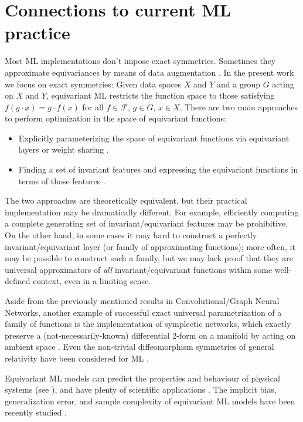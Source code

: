 \documentclass[preprint]{article} %
\renewcommand{\mathcal}[1]{\mathscr{#1}} %
\begin{document}
\section{Connections to current ML practice}\label{sec:practice}
Most ML implementations don't impose exact symmetries. Sometimes they approximate equivariances by means of data augmentation \citep{chen2020group, huang2022quantifying}.
In the present work we focus on exact symmetries: Given data spaces $X$ and $Y$ and a group $G$ acting on $X$ and $Y$, equivariant ML restricts the function space to those satisfying  $f(g\cdot x) = g \cdot f(x)$ for all $f\in \mathcal F$, $g\in G$, $x\in X$.
There are two main approaches to perform optimization in the space of equivariant functions:
\begin{itemize}
    \item Explicitly parameterizing the space of equivariant functions via equivariant layers or weight sharing \citep{cohen2016group, kondor2018convolution, thomas2018tensor, geiger2022e3nn, finzi2020generalizing, finzi2021practical}.
    \item Finding a set of invariant features and expressing the equivariant functions in terms of those features \citep{villar2021scalars,blum2022equivariant}.
\end{itemize}
The two approaches are theoretically equivalent, but their practical implementation may be dramatically different. For example, efficiently computing a complete generating set of invariant/equivariant features may be prohibitive. On the other hand, in some cases it may hard to construct a perfectly invariant/equivariant layer (or family of approximating functions); more often, it may be possible to construct such a family, but we may lack proof that they are universal approximators of \textit{all} invariant/equivariant functions within some well-defined context, even in a limiting sense.

Aside from the previously mentioned results in Convolutional/Graph Neural Networks, another example of successful exact universal parametrization of a family of functions is the implementation of symplectic networks, which exactly preserve a (not-necessarily-known) differential 2-form on a manifold by acting on ambient space \citep{sympnets,henonnets}. Even the non-trivial diffeomorphism symmetries of general relativity have been considered for ML \citep{weiler}.
 
Equivariant ML models can predict the properties and behaviour of physical systems (see \citealt{cheng2019covariance}), and have plenty of scientific applications \citep{batzner20223, musaelian2022learning, stark2022equibind, yu-physics, wang2022approximately}. The implicit bias, generalization error, and sample complexity of equivariant ML models have been recently studied \citep{lawrence2021implicit, bietti2021sample, elesedy2021provably, elesedy2021kernel, mei2021learning}.
\end{document}
